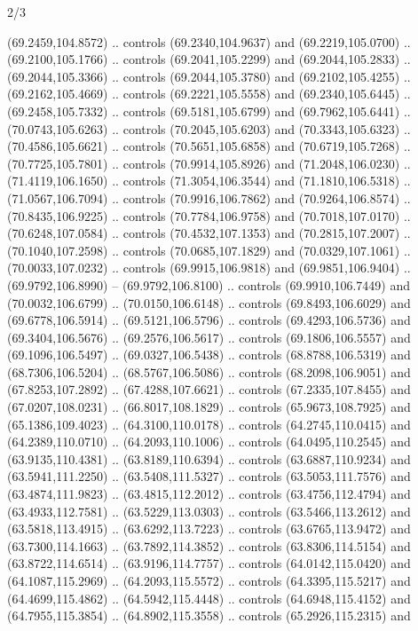 \begin{flagdescription}{2/3}
\begin{scope}[shift={(0.5\flaglength,0.5)},scale=\flagwidth/320]
\begin{scope}[y=0.8pt, x=0.8pt, yscale=-1,shift={(-118.3,-146)}]
  (69.2459,104.8572) .. controls (69.2340,104.9637) and (69.2219,105.0700) ..
  (69.2100,105.1766) .. controls (69.2041,105.2299) and (69.2044,105.2833) ..
  (69.2044,105.3366) .. controls (69.2044,105.3780) and (69.2102,105.4255) ..
  (69.2162,105.4669) .. controls (69.2221,105.5558) and (69.2340,105.6445) ..
  (69.2458,105.7332) .. controls (69.5181,105.6799) and (69.7962,105.6441) ..
  (70.0743,105.6263) .. controls (70.2045,105.6203) and (70.3343,105.6323) ..
  (70.4586,105.6621) .. controls (70.5651,105.6858) and (70.6719,105.7268) ..
  (70.7725,105.7801) .. controls (70.9914,105.8926) and (71.2048,106.0230) ..
  (71.4119,106.1650) .. controls (71.3054,106.3544) and (71.1810,106.5318) ..
  (71.0567,106.7094) .. controls (70.9916,106.7862) and (70.9264,106.8574) ..
  (70.8435,106.9225) .. controls (70.7784,106.9758) and (70.7018,107.0170) ..
  (70.6248,107.0584) .. controls (70.4532,107.1353) and (70.2815,107.2007) ..
  (70.1040,107.2598) .. controls (70.0685,107.1829) and (70.0329,107.1061) ..
  (70.0033,107.0232) .. controls (69.9915,106.9818) and (69.9851,106.9404) ..
  (69.9792,106.8990) -- (69.9792,106.8100) .. controls (69.9910,106.7449) and
  (70.0032,106.6799) .. (70.0150,106.6148) .. controls (69.8493,106.6029) and
  (69.6778,106.5914) .. (69.5121,106.5796) .. controls (69.4293,106.5736) and
  (69.3404,106.5676) .. (69.2576,106.5617) .. controls (69.1806,106.5557) and
  (69.1096,106.5497) .. (69.0327,106.5438) .. controls (68.8788,106.5319) and
  (68.7306,106.5204) .. (68.5767,106.5086) .. controls (68.2098,106.9051) and
  (67.8253,107.2892) .. (67.4288,107.6621) .. controls (67.2335,107.8455) and
  (67.0207,108.0231) .. (66.8017,108.1829) .. controls (65.9673,108.7925) and
  (65.1386,109.4023) .. (64.3100,110.0178) .. controls (64.2745,110.0415) and
  (64.2389,110.0710) .. (64.2093,110.1006) .. controls (64.0495,110.2545) and
  (63.9135,110.4381) .. (63.8189,110.6394) .. controls (63.6887,110.9234) and
  (63.5941,111.2250) .. (63.5408,111.5327) .. controls (63.5053,111.7576) and
  (63.4874,111.9823) .. (63.4815,112.2012) .. controls (63.4756,112.4794) and
  (63.4933,112.7581) .. (63.5229,113.0303) .. controls (63.5466,113.2612) and
  (63.5818,113.4915) .. (63.6292,113.7223) .. controls (63.6765,113.9472) and
  (63.7300,114.1663) .. (63.7892,114.3852) .. controls (63.8306,114.5154) and
  (63.8722,114.6514) .. (63.9196,114.7757) .. controls (64.0142,115.0420) and
  (64.1087,115.2969) .. (64.2093,115.5572) .. controls (64.3395,115.5217) and
  (64.4699,115.4862) .. (64.5942,115.4448) .. controls (64.6948,115.4152) and
  (64.7955,115.3854) .. (64.8902,115.3558) .. controls (65.2926,115.2315) and

\end{scope}
\end{scope}
\end{flagdescription}
